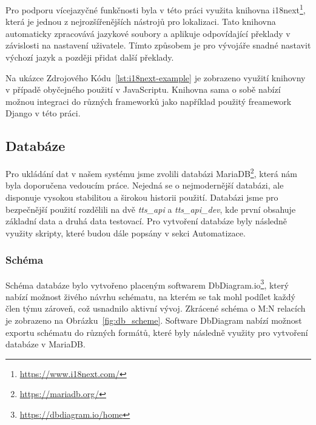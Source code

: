 Pro podporu vícejazyčné funkčnosti byla v této práci využita knihovna i18next\footnote{\href{https://www.i18next.com/}{https://www.i18next.com/}}, která je jednou z nejrozšířenějších nástrojů pro lokalizaci. Tato knihovna automaticky zpracovává jazykové soubory a aplikuje odpovídající překlady v závislosti na nastavení uživatele. Tímto způsobem je pro vývojáře snadné nastavit výchozí jazyk a později přidat další překlady.



Na ukázce Zdrojového Kódu~\ref{lst:i18next-example} je zobrazeno využití knihovny v případě obyčejného použití v JavaScriptu. Knihovna sama o sobě nabízí možnou integraci do různých frameworků jako například použitý freamework Django v této práci.

\subsection{Databáze}
\label{subsec:implementation-technologies-database}
Pro ukládání dat v našem systému jsme zvolili databázi MariaDB\footnote{\href{https://mariadb.org/}{https://mariadb.org/}}, která nám byla doporučena vedoucím práce. Nejedná se o nejmodernější databázi, ale disponuje vysokou stabilitou a širokou historii použití. Databázi jsme pro bezpečnější použití rozdělili na dvě \textit{tts\_api} a \textit{tts\_api\_dev}, kde první obsahuje základní data a druhá data testovací. Pro vytvoření databáze byly následně využity skripty, které budou dále popsány v sekci Automatizace.

\subsubsection*{Schéma}
\label{subsubsec:implementation-technologies-database-scheme}
Schéma databáze bylo vytvořeno placeným softwarem DbDiagram.io\footnote{\href{https://dbdiagram.io/home}{https://dbdiagram.io/home}}, který nabízí možnost živého návrhu schématu, na kterém se tak mohl podílet každý člen týmu zároveň, což usnadnilo aktivní vývoj. Zkrácené schéma o M:N relacích je zobrazeno na Obrázku~\ref{fig:db_scheme}. Software DbDiagram nabízí možnost exportu schématu do různých formátů, které byly následně využity pro vytvoření databáze v MariaDB\@.


